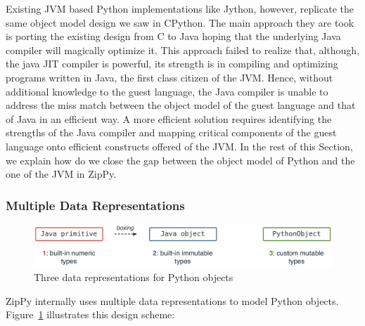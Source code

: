 Existing JVM based Python implementations like Jython, however, replicate the same object model design we saw in CPython.
The main approach they are took is porting the existing design from C to Java hoping that the underlying Java compiler will magically optimize it.
This approach failed to realize that, although, the java JIT compiler is powerful, its strength is in compiling and optimizing programs written in Java,
the first class citizen of the JVM.
Hence, without additional knowledge to the guest language, the Java compiler is unable to address the miss match between the object model of the guest language and that of Java in an efficient way.
A more efficient solution requires identifying the strengths of the Java compiler and mapping critical components of the guest language onto efficient constructs offered of the JVM.
In the rest of this Section, we explain how do we close the gap between the object model of Python and the one of the JVM in ZipPy.

\subsubsection{Multiple Data Representations}

\begin{figure}
\centering
\includegraphics[scale=.6]{figures/ch5-three-data-representations}
\caption{Three data representations for Python objects}
\label{fig:ch5-three-data-representations}
\end{figure}

ZipPy internally uses multiple data representations to model Python objects.
Figure~\ref{fig:ch5-three-data-representations} illustrates this design scheme:


